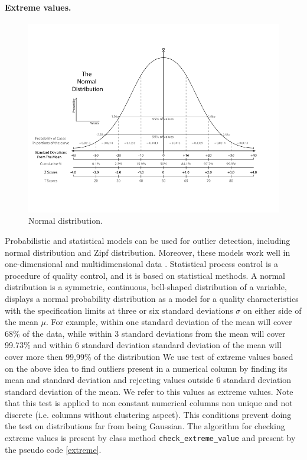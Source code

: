 \documentclass{article}
\begin{document}
\paragraph{Extreme values.} %
\label{sub:Extreme values}
\begin{figure}[H]
    \centering
    \includegraphics[width=0.8\linewidth]{picture/normal.png}
    \caption{Normal distribution.}
    \label{fig:normal}
\end{figure}
Probabilistic and statistical models can be used for outlier detection, including normal distribution and Zipf distribution. Moreover, these models work well in one-dimensional and
multidimensional data \cite{dai_yosh_pars}.
Statistical process control is a procedure of quality control, and it is based on statistical methods.
A normal distribution is a symmetric, continuous, bell-shaped distribution of a variable, displays a normal probability distribution as a model for a quality characteristics with the specification limits at three or six standard deviations $\sigma$ on either side of the mean $\mu$.
For example, within one standard deviation of the mean will cover 68\% of the data, while within 3 standard deviations from the mean will cover 99.73\% and within 6 standard deviation standard deviation of the mean will cover more then 99,99\% of the distribution
We use test of extreme values based on the above idea to find outliers present in a numerical column by finding its mean and standard deviation and rejecting values outside 6 standard deviation standard deviation of the mean.
We refer to this values as extreme values. Note that this test is applied to non constant numerical columns non unique and not discrete (i.e. columns without clustering aspect). This conditions prevent doing the test on distributions far from being Gaussian.
The algorithm for checking extreme values is present by class method \texttt{check\_extreme\_value}  and present by the pseudo code \ref{extreme}.
\end{document}
